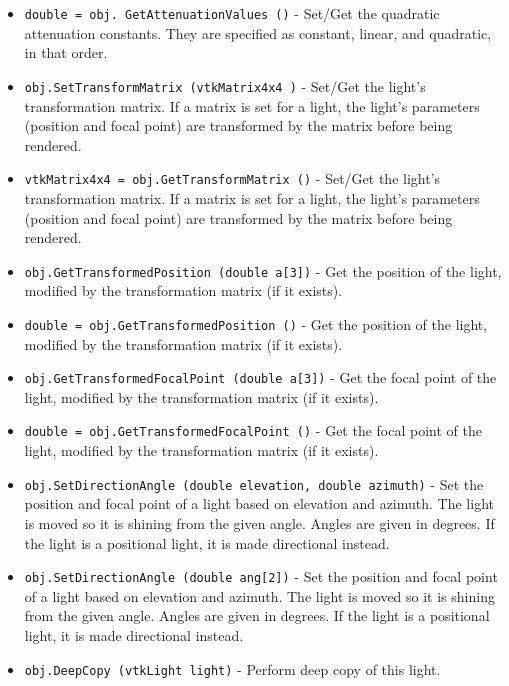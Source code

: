 \begin{itemize}
\item  \verb|double = obj. GetAttenuationValues ()| -  Set/Get the quadratic attenuation constants. They are specified as
 constant, linear, and quadratic, in that order.

\item  \verb|obj.SetTransformMatrix (vtkMatrix4x4 )| -  Set/Get the light's transformation matrix.  If a matrix is set for
 a light, the light's parameters (position and focal point) are 
 transformed by the matrix before being rendered.

\item  \verb|vtkMatrix4x4 = obj.GetTransformMatrix ()| -  Set/Get the light's transformation matrix.  If a matrix is set for
 a light, the light's parameters (position and focal point) are 
 transformed by the matrix before being rendered.

\item  \verb|obj.GetTransformedPosition (double a[3])| -  Get the position of the light, modified by the transformation matrix
 (if it exists).

\item  \verb|double = obj.GetTransformedPosition ()| -  Get the position of the light, modified by the transformation matrix
 (if it exists).

\item  \verb|obj.GetTransformedFocalPoint (double a[3])| -  Get the focal point of the light, modified by the transformation matrix
 (if it exists).

\item  \verb|double = obj.GetTransformedFocalPoint ()| -  Get the focal point of the light, modified by the transformation matrix
 (if it exists).

\item  \verb|obj.SetDirectionAngle (double elevation, double azimuth)| -  Set the position and focal point of a light based on elevation and
 azimuth.  The light is moved so it is shining from the given angle.
 Angles are given in degrees.  If the light is a
 positional light, it is made directional instead.

\item  \verb|obj.SetDirectionAngle (double ang[2])| -  Set the position and focal point of a light based on elevation and
 azimuth.  The light is moved so it is shining from the given angle.
 Angles are given in degrees.  If the light is a
 positional light, it is made directional instead.

\item  \verb|obj.DeepCopy (vtkLight light)| -  Perform deep copy of this light.


\end{itemize}
